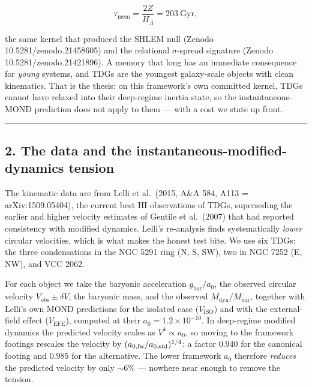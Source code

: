\documentclass[
]{article}
\begin{document}
\[
\tau_\mathrm{mem} = \frac{2Z}{H_\Lambda} = 203\ \text{Gyr},
\]

the same kernel that produced the SHLEM null (Zenodo
10.5281/zenodo.21458605) and the relational \(\sigma\)-spread signature
(Zenodo 10.5281/zenodo.21421896). A memory that long has an immediate
consequence for \emph{young} systems, and TDGs are the youngest
galaxy-scale objects with clean kinematics. That is the thesis: on this
framework's own committed kernel, TDGs cannot have relaxed into their
deep-regime inertia state, so the instantaneous-MOND prediction does not
apply to them --- with a cost we state up front.

\begin{center}\rule{0.5\linewidth}{0.5pt}\end{center}

\subsection{2. The data and the instantaneous-modified-dynamics
tension}\label{the-data-and-the-instantaneous-modified-dynamics-tension}

The kinematic data are from Lelli et al.~(2015, A\&A 584, A113 =
arXiv:1509.05404), the current best HI observations of TDGs, superseding
the earlier and higher velocity estimates of Gentile et al.~(2007) that
had reported consistency with modified dynamics. Lelli's re-analysis
finds systematically \emph{lower} circular velocities, which is what
makes the honest test bite. We use six TDGs: the three condensations in
the NGC 5291 ring (N, S, SW), two in NGC 7252 (E, NW), and VCC 2062.

For each object we take the baryonic acceleration \(g_\mathrm{bar}/a_0\),
the observed circular velocity \(V_\mathrm{obs}\pm\delta V\), the baryonic
mass, and the observed \(M_\mathrm{dyn}/M_\mathrm{bar}\), together with
Lelli's own MOND predictions for the isolated case (\(V_\mathrm{ISO}\)) and
with the external-field effect (\(V_\mathrm{EFE}\)), computed at their
\(a_0 = 1.2\times10^{-10}\). In deep-regime modified dynamics the
predicted velocity scales as \(V^4\propto a_0\), so moving to the
framework footings rescales the velocity by
\((a_{0,\rm fw}/a_{0,\rm std})^{1/4}\): a factor \(0.940\) for the
canonical footing and \(0.985\) for the alternative. The lower framework
\(a_0\) therefore \emph{reduces} the predicted velocity by only
\(\sim\!6\%\) --- nowhere near enough to remove the tension.
\end{document}
